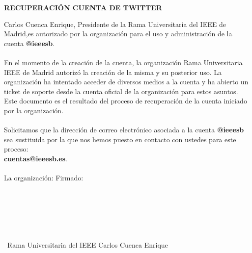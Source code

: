 \documentclass[11pt]{article} %
\newcommand{\thetitle}{Recuperación Cuenta de Twitter}
\begin{document}
\begin{center}
  \bf \LARGE
  \MakeUppercase{\thetitle}
\end{center}
    Carlos Cuenca Enrique, Presidente de la Rama Universitaria del IEEE de Madrid,es autorizado por la organización para el uso y administración de la cuenta \textbf{@ieeesb}.\\ \\
    En el momento de la creación de la cuenta, la organización Rama Universitaria IEEE de Madrid autorizó la creación de la misma y su posterior uso.
    La organización ha intentado acceder de diversos medios a la cuenta y ha abierto un ticket de soporte desde la cuenta oficial de la organización para estos asuntos. Este documento es el resultado del proceso de recuperación de la cuenta iniciado por la organización. \\ \\
    Solicitamos que la dirección de correo electrónico asociada a la cuenta \textbf{@ieeesb}  sea sustituida por la que nos hemos puesto en contacto con ustedes para este proceso: \\ \textbf{cuentas@ieeesb.es}. \\ \\
    
    La organización: \hspace{200pt} Firmado: \\\\\\\\\\\\\\\ Rama Universitaria del IEEE \hspace{150pt}Carlos Cuenca Enrique
\end{document}
